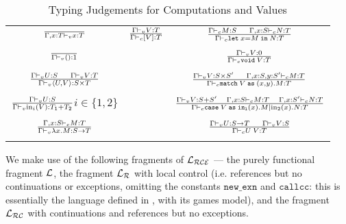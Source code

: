 \documentclass{eptcs}
\def\L{{\cal{L}}}
\newcommand{\cse}{{\mathtt{case}}}
\newcommand{\as}{{\mathtt{as}}}
\newcommand{\void}{{\mathtt{void}}}
\newcommand{\match}{{\mathtt{match}}}
\newcommand{\lett}{{\mathtt{let}}}
\newcommand{\spc}{\hspace{2pt}}
\newcommand{\inj}{\mathrm{in}}
\newcommand{\inl}{{\mathtt{in_l}}}
\newcommand{\callcc}{{\mathtt{callcc}}}
\newcommand{\Lr}{{\cal{L_R}}}
\newcommand{\Lc}{{\cal{L_{RC}}}}
\newcommand{\Lce}{{\cal{L_{RCE}}}}
\newcommand{\nxn}{{\mathtt{new\_exn}}}
\newcommand{\inn}{{{\mathtt{in}}}}
\begin{document}
\begin{table}
\begin{center}
\begin{tabular}{c c c} 
{\Large $\over \Gamma,x:T \vdash_v x:T$} & {\Large $ \Gamma \vdash_v V:T \over \Gamma \vdash_c [V]:T$}  & {\Large $\Gamma \vdash_c M:S\ \ \ \ \Gamma,x:S \vdash_c N:T \over \Gamma \vdash_c \lett \spc x = M\spc \inn\spc N:T$}\\\\
{\Large $\over \Gamma \vdash_v ():1$}&  & {\Large $\Gamma \vdash_v V:0 \over \Gamma \vdash_c \void\spc V: T$} \\\\
{\Large $\Gamma \vdash_v U:S \ \ \ \ \Gamma \vdash_v V:T  \over \Gamma \vdash_v \langle U,V\rangle :S \times T$} & & {\Large $\Gamma \vdash_v V:S \times S' \ \ \ \ \Gamma,x:S,y:S' \vdash_c M:T \over  \Gamma \vdash_c \match\spc V\spc \as\spc (x,y).M:T$}  \\\\
{\Large $\Gamma \vdash_v U:S \over \Gamma \vdash_v \inj_i(V):T_1 + T_2$}\mbox{$i \in \{1,2\}$}& & {\Large $\Gamma \vdash_v V:S + S' \ \ \ \Gamma,x:S \vdash_c M:T\ \ \  \Gamma,x:S' \vdash_c N:T \over \Gamma \vdash_c \cse\spc V\spc \as\spc \inl(x).M|\inj_2(x).N:T$}\\\\
{\Large $\Gamma, x:S \vdash_c M:T \over \Gamma \vdash_v \lambda x.M:S \rightarrow T$} & & {\Large $\Gamma \vdash_v U:S\rightarrow T\ \ \ \ \Gamma \vdash_v V:S \over \Gamma \vdash_c U \spc V:T$}\\\\
\end{tabular}
\caption{Typing Judgements for Computations and Values}
\end{center}
\end{table}
We make use of the following fragments of $\Lce$ --- the purely functional fragment $\L$,  the fragment  $\Lr$ with local control  (i.e. references but no continuations or exceptions, omitting  the constants $\nxn$ and $\callcc$: this is essentially the language   defined  in \cite{AHM}, with its games model), and   the fragment $\Lc$ with continuations and references but no exceptions. 
\end{document}

